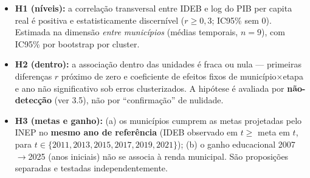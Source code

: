 \documentclass[12pt,a4paper]{article}
\begin{document}
\begin{itemize}
\item \textbf{H1 (níveis):} a correlação transversal entre IDEB e log do PIB per capita real é positiva e estatisticamente discernível ($r \geq 0{,}3$; IC95\% sem 0). Estimada na dimensão \textit{entre municípios} (médias temporais, $n = 9$), com IC95\% por bootstrap por cluster.
\item \textbf{H2 (dentro):} a associação dentro das unidades é fraca ou nula --- primeiras diferenças $r$ próximo de zero e coeficiente de efeitos fixos de município$\times$etapa e ano não significativo sob erros clusterizados. A hipótese é avaliada por \textbf{não-detecção} (ver 3.5), não por ``confirmação'' de nulidade.
\item \textbf{H3 (metas e ganho):} (a) os municípios cumprem as metas projetadas pelo INEP no \textbf{mesmo ano de referência} (IDEB observado em $t \geq$ meta em $t$, para $t \in \{2011, 2013, 2015, 2017, 2019, 2021\}$); (b) o ganho educacional 2007$\rightarrow$2025 (anos iniciais) não se associa à renda municipal. São proposições separadas e testadas independentemente.
\end{itemize}
\end{document}
